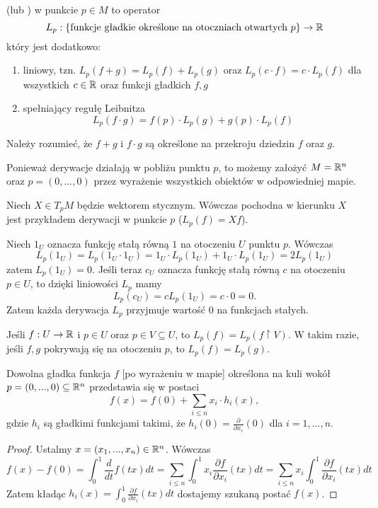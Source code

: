 \begin{definition}
   (lub ) w punkcie $p\in M$ to operator
  $$L_p:\{\text{funkcje gładkie określone na otoczniach otwartych }p\}\to \mathbb{R}$$
  który jest dodatkowo:
  \begin{enumerate}
    \item liniowy, tzn. $L_p(f+g)=L_p(f)+L_p(g)$ oraz $L_p(c\cdot f)=c\cdot L_p(f)$ dla wszystkich $c\in\mathbb{R}$ oraz funkcji gładkich $f,g$
    \item spełniający regułę Leibnitza
      $$L_p(f\cdot g)=f(p)\cdot L_p(g)+g(p)\cdot L_p(f)$$
  \end{enumerate}

  Należy rozumieć, że $f+g$ i $f\cdot g$ są określone na przekroju dziedzin $f$ oraz $g$.
\end{definition}

Ponieważ derywacje działają w pobliżu punktu $p$, to możemy założyć $M=\mathbb{R}^n$ oraz $p=(0,...,0)$ przez wyrażenie wszystkich obiektów w odpowiedniej mapie.

\begin{example}
  \item Niech $X\in T_pM$ będzie wektorem stycznym. Wówczas pochodna w kierunku $X$ jest przykładem derywacji w punkcie $p$ ($L_p(f)=X f$).
\end{example}

Niech $1_U$ oznacza funkcję stałą równą $1$ na otoczeniu $U$ punktu $p$. Wówczas
$$L_p(1_U)=L_p(1_U\cdot 1_U)=1_U\cdot L_p(1_U)+1_U\cdot L_p(1_U)=2L_p(1_U)$$
zatem $L_p(1_U)=0$. Jeśli teraz $c_U$ oznacza funkcję stałą równą $c$ na otoczeniu $p\in U$, to dzięki liniowości $L_p$ mamy
$$L_p(c_U)=cL_p(1_U)=c\cdot 0=0.$$
Zatem każda derywacja $L_p$ przyjmuje wartość $0$ na funkcjach stałych.

Jeśli $f:U\to \mathbb{R}$ i $p\in U$ oraz $p\in V\subseteq U$, to $L_p(f)=L_p(f\restriction V)$. W takim razie, jeśli $f,g$ pokrywają się na otoczeniu $p$, to $L_p(f)=L_p(g)$.

\begin{lemma}
  Dowolna gładka funkcja $f$ [po wyrażeniu w mapie] określona na kuli wokół $p=(0,...,0)\subseteq\mathbb{R}^n$ przedstawia się w postaci 
  $$f(x)=f(0)+\sum_{i\leq n}x_i\cdot h_i(x),$$ 
  gdzie $h_i$ są gładkimi funkcjami takimi, że $h_i(0)=\frac{\partial}{\partial x_i}(0)$ dla $i=1,...,n$.
\end{lemma}

\begin{proof}
  Ustalmy $x=(x_1,...,x_n)\in\mathbb{R}^n$. Wówczas
  $$f(x)-f(0)=\int_0^1\frac{d}{dt}f(tx)dt=\sum_{i\leq n}\int_0^1x_i\frac{\partial f}{\partial x_i}(tx)dt=\sum_{i\leq n}x_i\int_0^1\frac{\partial f}{\partial x_i}(tx)dt$$
  Zatem kładąc $h_i(x)=\int_0^1\frac{\partial f}{\partial x_i}(tx)dt$ dostajemy szukaną postać $f(x)$.
\end{proof}

